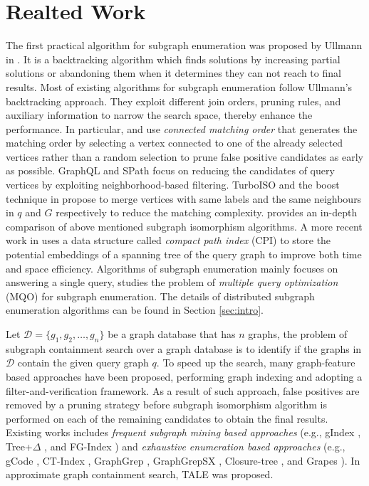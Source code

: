 \section{Realted Work}
\label{sec:rel}

 The first practical algorithm for subgraph enumeration was proposed by Ullmann in \cite{Ullmann1976}. It is a backtracking algorithm which finds solutions by increasing partial solutions or abandoning them when it determines they can not reach to final results. Most of existing algorithms for subgraph enumeration follow Ullmann's backtracking approach. They exploit different join orders, pruning rules, and auxiliary information to narrow the search space, thereby enhance the performance. In particular, \vftwo \cite{cordella2004sub} and \quicksi \cite{Shang2008} use \textit{connected matching order} that generates the matching order by selecting a vertex connected to one of the already selected vertices rather than a random selection to prune false positive candidates as early as possible. GraphQL \cite{graph-ql} and SPath \cite{spath} focus on reducing the candidates of query vertices by exploiting neighborhood-based filtering. TurboISO \cite{turbo-iso} and the boost technique in \cite{subgraph-boost} propose to merge vertices with same labels and the same neighbours in $q$ and $G$ respectively to reduce the matching complexity. \cite{comparison} provides an in-depth comparison of above mentioned subgraph isomorphism algorithms. A more recent work in \cite{bi-fei} uses a data structure called \textit{compact path index} (CPI) to store the potential embeddings of a spanning tree of the query graph to improve both time and space efficiency. Algorithms of subgraph enumeration mainly focuses on answering a single query, \cite{multi-query} studies the problem of \textit{multiple query optimization} (MQO) for subgraph enumeration. The details of distributed subgraph enumeration algorithms can be found in Section \ref{sec:intro}.

 Let $\mathcal{D}=\{g_1,g_2,\dots,g_n\}$ be a graph database that has $n$ graphs, the problem of subgraph containment search over a graph database is to identify if the graphs in $\mathcal{D}$ contain the given query graph $q$. To speed up the search, many graph-feature based approaches have been proposed, performing graph indexing and adopting a filter-and-verification framework. As a result of such approach, false positives are removed by a pruning strategy before subgraph isomorphism algorithm is performed on each of the remaining candidates to obtain the final results. Existing works includes \textit{frequent subgraph mining based approaches} (e.g., gIndex \cite{gindex}, Tree+$\Delta$ \cite{tree+}, and FG-Index \cite{fg-index}) and \textit{exhaustive enumeration based approaches} (e.g., gCode \cite{gcode}, CT-Index \cite{ct-index}, GraphGrep \cite{graph-grep}, GraphGrepSX \cite{graph-grep-sx}, Closure-tree \cite{closure-tree}, and Grapes \cite{grapes}). In approximate graph containment search, TALE \cite{tale} was proposed.